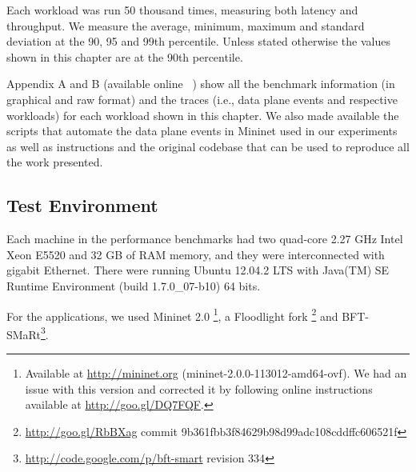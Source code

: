 Each workload was run 50 thousand times, measuring both latency and throughput. 
We measure the average, minimum, maximum and standard deviation at the 90, 95 and 99th percentile. 
Unless stated otherwise the values shown in this chapter are at the 90th percentile. 

Appendix A and B (available online ~\cite{support}) show all the benchmark information (in graphical and raw format) and the traces (i.e., data plane events and respective workloads) for each workload shown in this chapter.  
We also made available the scripts that automate the data plane events in Mininet used in our experiments as well as instructions and the original codebase that can be used to reproduce all the work presented. 

\subsection{Test Environment}
Each machine in the performance benchmarks had two quad-core 2.27 GHz Intel Xeon E5520 and 32 GB of RAM memory, and they were interconnected with gigabit Ethernet. 
There were running  Ubuntu 12.04.2 LTS with  Java(TM) SE Runtime Environment (build 1.7.0\_07-b10) 64 bits.

For the applications, we  used Mininet 2.0 \footnote{Available at \url{http://mininet.org} (mininet-2.0.0-113012-amd64-ovf). We had an issue with this version and corrected it by following online instructions available at \url{http://goo.gl/DQ7FQF}.},  a Floodlight fork \footnote{\url{http://goo.gl/RbBXag} commit 9b361fbb3f84629b98d99adc108cddffc606521f} and  BFT-SMaRt\footnote{\url{http://code.google.com/p/bft-smart} revision 334}.  


